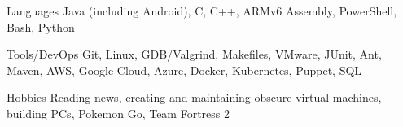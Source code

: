 

\begin{cvskills}


  \cvskill
    {Languages} %
    {Java (including Android), C, C++, ARMv6 Assembly, PowerShell, Bash, Python} %
    
  \cvskill
    {Tools/DevOps} %
    {Git, Linux, GDB/Valgrind, Makefiles, VMware, JUnit, Ant, Maven, AWS, Google Cloud, Azure, Docker, Kubernetes, Puppet, SQL} %

  \cvskill
  {Hobbies} %
  {Reading news, creating and maintaining obscure virtual machines, building PCs, Pokemon Go, Team Fortress 2} %

\end{cvskills}
